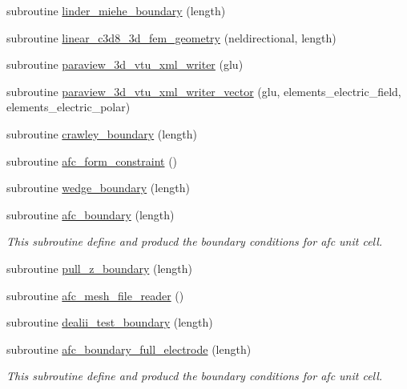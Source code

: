 \begin{DoxyCompactItemize}
subroutine \hyperlink{classfem__geometry_ae4656919e5f7fed07431e504d7530bb4}{linder\+\_\+miehe\+\_\+boundary} (length)
\item 
subroutine \hyperlink{classfem__geometry_ad3842323e2f57450b04bd0d82c32620e}{linear\+\_\+c3d8\+\_\+3d\+\_\+fem\+\_\+geometry} (neldirectional, length)
\item 
subroutine \hyperlink{classfem__geometry_a7f0f5ce390e6d3c282cf496e4adc8a3a}{paraview\+\_\+3d\+\_\+vtu\+\_\+xml\+\_\+writer} (glu)
\item 
subroutine \hyperlink{classfem__geometry_ad7d7841e3a698540494f05f533685fd4}{paraview\+\_\+3d\+\_\+vtu\+\_\+xml\+\_\+writer\+\_\+vector} (glu, elements\+\_\+electric\+\_\+field, elements\+\_\+electric\+\_\+polar)
\item 
subroutine \hyperlink{classfem__geometry_a60426131ee37ca0abc2c516605a8242b}{crawley\+\_\+boundary} (length)
\item 
subroutine \hyperlink{classfem__geometry_a3bfe6eaaa8abccf9b97a20fd0287d398}{afc\+\_\+form\+\_\+constraint} ()
\item 
subroutine \hyperlink{classfem__geometry_a635d070c2958ec3dc66476e8f771db69}{wedge\+\_\+boundary} (length)
\item 
subroutine \hyperlink{classfem__geometry_ab950de22f663d909af3db42925f71d89}{afc\+\_\+boundary} (length)
\begin{DoxyCompactList}\small\item\em This subroutine define and producd the boundary conditions for afc unit cell. \end{DoxyCompactList}\item 
subroutine \hyperlink{classfem__geometry_a5620d9bbf7f3b0e2ffb059fffd4bbb4a}{pull\+\_\+z\+\_\+boundary} (length)
\item 
subroutine \hyperlink{classfem__geometry_ad4b3e4030adcde19c84604879a7c3253}{afc\+\_\+mesh\+\_\+file\+\_\+reader} ()
\item 
subroutine \hyperlink{classfem__geometry_a2545609597d328caf470a5b1140b3b7e}{dealii\+\_\+test\+\_\+boundary} (length)
\item 
subroutine \hyperlink{classfem__geometry_aa24a402524875f30d7ca70c34f681999}{afc\+\_\+boundary\+\_\+full\+\_\+electrode} (length)
\begin{DoxyCompactList}\small\item\em This subroutine define and producd the boundary conditions for afc unit cell. \end{DoxyCompactList}\end{DoxyCompactItemize}
